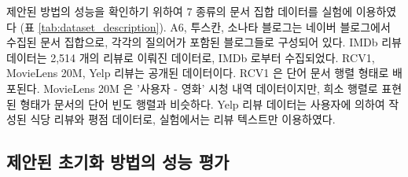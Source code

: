 \documentclass[oneside, ko,phd]{snuthesis_utf8_kor}
\begin{document}
제안된 방법의 성능을 확인하기 위하여 7 종류의 문서 집합 데이터를 실험에 이용하였다 (표 \ref{tab:dataset_description}).
A6, 투스칸, 소나타 블로그는 네이버 블로그에서 수집된 문서 집합으로, 각각의 질의어가 포함된 블로그들로 구성되어 있다.
IMDb 리뷰 데이터는 2,514 개의 리뷰로 이뤄진 데이터로, IMDb 로부터 수집되었다.
RCV1, MovieLens 20M, Yelp 리뷰는 공개된 데이터이다.
RCV1 은 단어 문서 행렬 형태로 배포된다.
MovieLens 20M 은 '사용자 - 영화' 시청 내역 데이터이지만, 희소 행렬로 표현된 형태가 문서의 단어 빈도 행렬과 비슷하다.
Yelp 리뷰 데이터는 사용자에 의하여 작성된 식당 리뷰와 평점 데이터로, 실험에서는 리뷰 텍스트만 이용하였다.

\begin{table}[H]
\centering
\caption{실험에 이용한 7 종류의 데이터셋}
\label{tab:dataset_description}
\end{table}

\subsection{제안된 초기화 방법의 성능 평가}
\end{document}
